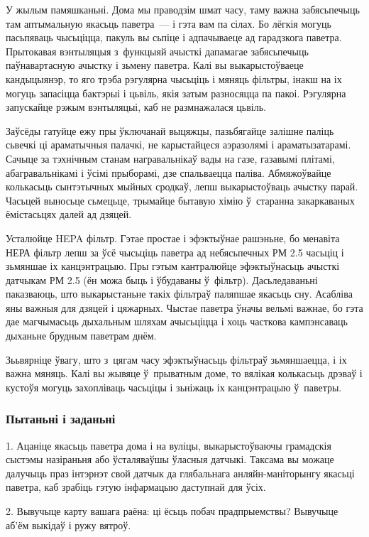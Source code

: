У жылым памяшканьні. Дома мы праводзім шмат часу, таму важна забясьпечыць там аптымальную якасьць паветра~--- і гэта вам па сілах. Бо лёгкія могуць пасьпяваць чысьціцца, пакуль вы сьпіце і адпачываеце ад гарадзкога паветра. Прытокавая вэнтыляцыя з~функцыяй ачысткі дапамагае забясьпечыць паўнавартасную ачыстку і зьмену паветра. Калі вы выкарыстоўваеце кандыцыянэр, то яго трэба рэгулярна чысьціць і мяняць фільтры, інакш на іх могуць запасіцца бактэрыі і цьвіль, якія затым разносяцца па пакоі. Рэгулярна запускайце рэжым вэнтыляцыі, каб не размнажалася цьвіль.

Заўсёды гатуйце ежу пры ўключанай выцяжцы, пазьбягайце залішне паліць сьвечкі ці араматычныя палачкі, не карыстайцеся аэразолямі і араматызатарамі. Сачыце за тэхнічным станам награвальнікаў вады на газе, газавымі плітамі, абагравальнікамі і ўсімі прыборамі, дзе спальваецца паліва. Абмяжоўвайце колькасьць сынтэтычных мыйных сродкаў, лепш выкарыстоўваць ачыстку парай. Часьцей выносьце сьмецьце, трымайце бытавую хімію ў~старанна закаркаваных ёмістасьцях далей ад дзяцей.

Усталюйце HEPA фільтр. Гэтае простае і эфэктыўнае рашэньне, бо менавіта НЕРА фільтр лепш за ўсё чысьціць паветра ад небясьпечных РМ 2.5 часьціц і зьмяншае іх канцэнтрацыю. Пры гэтым кантралюйце эфэктыўнасьць ачысткі датчыкам РМ 2.5 (ён можа быць і ўбудаваны ў~фільтр). Дасьледаваньні паказваюць, што выкарыстаньне такіх фільтраў паляпшае якасьць сну. Асабліва яны важныя для дзяцей і цяжарных. Чыстае паветра ўначы вельмі важнае, бо гэта дае магчымасьць дыхальным шляхам ачысьціцца і хоць часткова кампэнсаваць дыханьне брудным паветрам днём.

Зььвярніце ўвагу, што з~цягам часу эфэктыўнасьць фільтраў зьмяншаецца, і іх важна мяняць. Калі вы жывяце ў~прыватным доме, то вялікая колькасьць дрэваў і кустоўя могуць захопліваць часьціцы і зьніжаць іх канцэнтрацыю ў~паветры.

\subsubsection{Пытаньні і заданьні}

1. Ацаніце якасьць паветра дома і на вуліцы, выкарыстоўваючы грамадскія сыстэмы назіраньня або ўсталяваўшы ўласныя датчыкі. Таксама вы можаце далучыць праз інтэрнэт свой датчык да глябальнага анляйн-маніторынгу якасьці паветра, каб зрабіць гэтую інфармацыю даступнай для ўсіх.

2. Вывучыце карту вашага раёна: ці ёсьць побач прадпрыемствы? Вывучыце аб'ём выкідаў і ружу вятроў.

